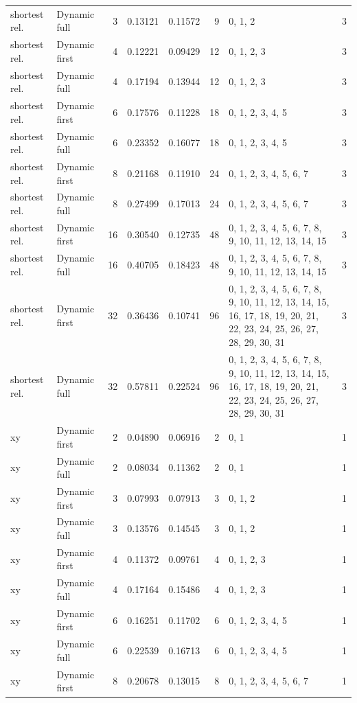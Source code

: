 \documentclass[10pt,a4paper]{article}
\begin{document}
\begin{longtable}{@{}p{23mm}p{29mm}rrrrp{36mm}r@{}}
shortest rel. & Dynamic full & 3 & 0.13121 & 0.11572 & 9 & 0, 1, 2 & 3 \\
shortest rel. & Dynamic first & 4 & 0.12221 & 0.09429 & 12 & 0, 1, 2, 3 & 3 \\
shortest rel. & Dynamic full & 4 & 0.17194 & 0.13944 & 12 & 0, 1, 2, 3 & 3 \\
shortest rel. & Dynamic first & 6 & 0.17576 & 0.11228 & 18 & 0, 1, 2, 3, 4, 5 & 3 \\
shortest rel. & Dynamic full & 6 & 0.23352 & 0.16077 & 18 & 0, 1, 2, 3, 4, 5 & 3 \\
shortest rel. & Dynamic first & 8 & 0.21168 & 0.11910 & 24 & 0, 1, 2, 3, 4, 5, 6, 7 & 3 \\
shortest rel. & Dynamic full & 8 & 0.27499 & 0.17013 & 24 & 0, 1, 2, 3, 4, 5, 6, 7 & 3 \\
shortest rel. & Dynamic first & 16 & 0.30540 & 0.12735 & 48 & 0, 1, 2, 3, 4, 5, 6, 7, 8, 9, 10, 11, 12, 13, 14, 15 & 3 \\
shortest rel. & Dynamic full & 16 & 0.40705 & 0.18423 & 48 & 0, 1, 2, 3, 4, 5, 6, 7, 8, 9, 10, 11, 12, 13, 14, 15 & 3 \\
shortest rel. & Dynamic first & 32 & 0.36436 & 0.10741 & 96 & 0, 1, 2, 3, 4, 5, 6, 7, 8, 9, 10, 11, 12, 13, 14, 15, 16, 17, 18, 19, 20, 21, 22, 23, 24, 25, 26, 27, 28, 29, 30, 31 & 3 \\
shortest rel. & Dynamic full & 32 & 0.57811 & 0.22524 & 96 & 0, 1, 2, 3, 4, 5, 6, 7, 8, 9, 10, 11, 12, 13, 14, 15, 16, 17, 18, 19, 20, 21, 22, 23, 24, 25, 26, 27, 28, 29, 30, 31 & 3 \\
xy & Dynamic first & 2 & 0.04890 & 0.06916 & 2 & 0, 1 & 1 \\
xy & Dynamic full & 2 & 0.08034 & 0.11362 & 2 & 0, 1 & 1 \\
xy & Dynamic first & 3 & 0.07993 & 0.07913 & 3 & 0, 1, 2 & 1 \\
xy & Dynamic full & 3 & 0.13576 & 0.14545 & 3 & 0, 1, 2 & 1 \\
xy & Dynamic first & 4 & 0.11372 & 0.09761 & 4 & 0, 1, 2, 3 & 1 \\
xy & Dynamic full & 4 & 0.17164 & 0.15486 & 4 & 0, 1, 2, 3 & 1 \\
xy & Dynamic first & 6 & 0.16251 & 0.11702 & 6 & 0, 1, 2, 3, 4, 5 & 1 \\
xy & Dynamic full & 6 & 0.22539 & 0.16713 & 6 & 0, 1, 2, 3, 4, 5 & 1 \\
xy & Dynamic first & 8 & 0.20678 & 0.13015 & 8 & 0, 1, 2, 3, 4, 5, 6, 7 & 1 \\

\end{longtable}
\end{document}

